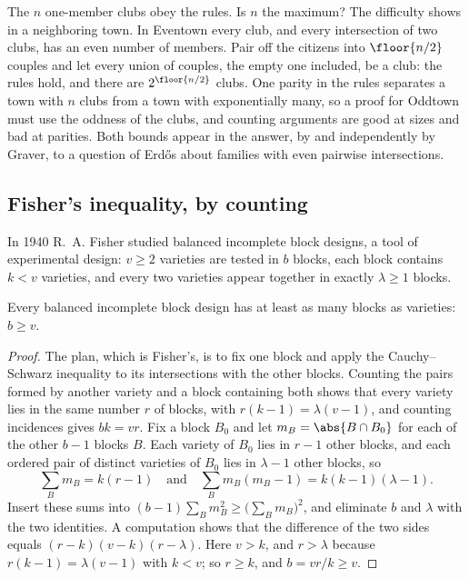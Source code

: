 \begin{refsection}
The $n$ one-member clubs obey the rules. Is $n$ the maximum? The difficulty shows in a neighboring town. In Eventown every club, and every intersection of two clubs, has an even number of members. Pair off the citizens into $\floor{n/2}$ couples and let every union of couples, the empty one included, be a club: the rules hold, and there are $2^{\floor{n/2}}$ clubs. One parity in the rules separates a town with $n$ clubs from a town with exponentially many, so a proof for Oddtown must use the oddness of the clubs, and counting arguments are good at sizes and bad at parities. Both bounds appear in the answer, by \textcite{Berlekamp1969} and independently by Graver, to a question of Erd\H{o}s about families with even pairwise intersections.

\subsection{Fisher's inequality, by counting}\label{sec:dimension:fisher-before}

In 1940 R.~A. Fisher studied balanced incomplete block designs, a tool of experimental design: $v\ge2$ varieties are tested in $b$ blocks, each block contains $k<v$ varieties, and every two varieties appear together in exactly $\lambda\ge1$ blocks.

\begin{theorem}\label{thm:dimension:fisherbibd}
Every balanced incomplete block design has at least as many blocks as varieties: $b\ge v$.
\end{theorem}

\begin{proof}
The plan, which is Fisher's, is to fix one block and apply the Cauchy--Schwarz inequality to its intersections with the other blocks. Counting the pairs formed by another variety and a block containing both shows that every variety lies in the same number $r$ of blocks, with $r(k-1)=\lambda(v-1)$, and counting incidences gives $bk=vr$. Fix a block $B_0$ and let $m_B=\abs{B\cap B_0}$ for each of the other $b-1$ blocks $B$. Each variety of $B_0$ lies in $r-1$ other blocks, and each ordered pair of distinct varieties of $B_0$ lies in $\lambda-1$ other blocks, so
\[
\sum_Bm_B=k(r-1)\quad\text{and}\quad\sum_Bm_B(m_B-1)=k(k-1)(\lambda-1).
\]
Insert these sums into $(b-1)\sum_Bm_B^2\ge\big(\sum_Bm_B\big)^2$, and eliminate $b$ and $\lambda$ with the two identities. A computation shows that the difference of the two sides equals $(r-k)(v-k)(r-\lambda)$. Here $v>k$, and $r>\lambda$ because $r(k-1)=\lambda(v-1)$ with $k<v$; so $r\ge k$, and $b=vr/k\ge v$.
\end{proof}


\end{refsection}
